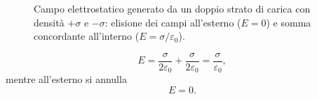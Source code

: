 \documentclass[11pt,a4paper]{article}
\newcommand{\epz}{\varepsilon_0}
\begin{document}
\begin{figure}[htbp]
	\caption{Campo elettrostatico generato da un doppio strato di carica con densità $+\sigma$ e $-\sigma$: elisione dei campi all'esterno ($E = 0$) e somma concordante all'interno ($E = \sigma/\varepsilon_0$).}
	\label{fig:doppio_strato_infografica}
\end{figure}



\[
E=\frac{\sigma}{2\epz}+\frac{\sigma}{2\epz}=\frac{\sigma}{\epz},
\]
mentre all'esterno si annulla
\[
E=0.
\]
\end{document}

